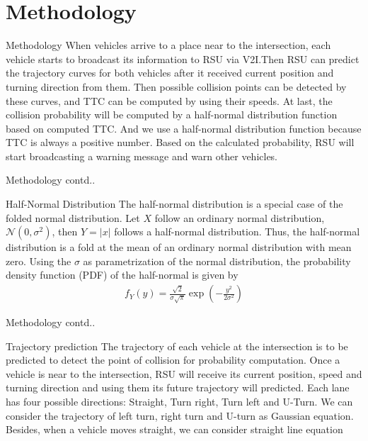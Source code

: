 \documentclass{beamer}
\providecommand{\brak}[1]{\ensuremath{\left(#1\right)}}
\begin{document}
\section{Methodology}
\begin{frame}{Methodology}
    When vehicles arrive to a place near to the intersection, each vehicle  starts  to  broadcast its information to RSU via V2I.Then RSU can predict the trajectory curves for both vehicles after it received current position and turning direction from them. Then possible collision points can be detected by these curves,  and  TTC can be computed by using their speeds. At last, the collision probability will be computed by a half-normal distribution function based on computed TTC. And we use a half-normal distribution function because TTC is always a positive number. Based on the calculated probability, RSU will start broadcasting a warning message and warn other vehicles. 
\end{frame}
\begin{frame}{Methodology contd..}
    \begin{block}{Half-Normal Distribution}
    The half-normal distribution is a special case of the folded normal distribution. Let $X$ follow an ordinary normal distribution, $\mathcal{N}(0,\sigma^2)$, then $Y=\lvert x\rvert$ follows a half-normal distribution. Thus, the half-normal distribution is a fold at the mean of an ordinary normal distribution with mean zero. 
    Using the $\sigma$ as parametrization of the normal distribution, the probability density function (PDF) of the half-normal is given by
    \begin{align}
        f_{Y}(y) = \frac{\sqrt{2}}{\sigma\sqrt{\pi}}\exp\brak{-\frac{y^2}{2\sigma^2}}
    \end{align}
    \end{block}
\end{frame}
\begin{frame}{Methodology contd..}
    \begin{block}{Trajectory prediction}
    The trajectory of each vehicle at the intersection is to be predicted to detect the point of collision for probability computation. Once a vehicle is near to the intersection, RSU will receive its current position, speed and turning direction and using them its future trajectory will predicted. Each lane has four possible directions: Straight, Turn right, Turn left and U-Turn. We can consider the trajectory of left turn, right turn and U-turn as Gaussian equation. Besides, when a vehicle moves straight, we can consider straight line equation
    \end{block}
\end{frame}
\end{document}

